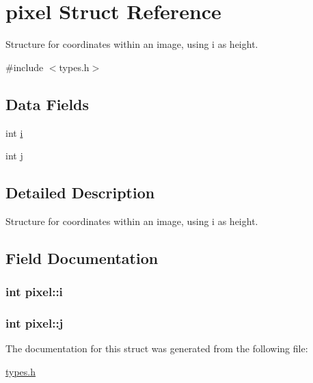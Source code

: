 \hypertarget{structpixel}{
\section{pixel Struct Reference}
\label{structpixel}
}


Structure for coordinates within an image, using i as height.  




{\ttfamily \#include $<$types.h$>$}

\subsection*{Data Fields}
\begin{DoxyCompactItemize}
\item 
int \hyperlink{structpixel_ae9afbc5abc48f3350a656ccab7083f20}{i}
\item 
int \hyperlink{structpixel_a67e06c45b5a0a77b3f1bf8e9cccfe588}{j}
\end{DoxyCompactItemize}


\subsection{Detailed Description}
Structure for coordinates within an image, using i as height. 

\subsection{Field Documentation}
\hypertarget{structpixel_ae9afbc5abc48f3350a656ccab7083f20}{
\subsubsection[{i}]{\setlength{\rightskip}{0pt plus 5cm}int {\bf pixel::i}}}
\label{structpixel_ae9afbc5abc48f3350a656ccab7083f20}
\hypertarget{structpixel_a67e06c45b5a0a77b3f1bf8e9cccfe588}{
\subsubsection[{j}]{\setlength{\rightskip}{0pt plus 5cm}int {\bf pixel::j}}}
\label{structpixel_a67e06c45b5a0a77b3f1bf8e9cccfe588}


The documentation for this struct was generated from the following file:\begin{DoxyCompactItemize}
\item 
\hyperlink{types_8h}{types.h}\end{DoxyCompactItemize}
